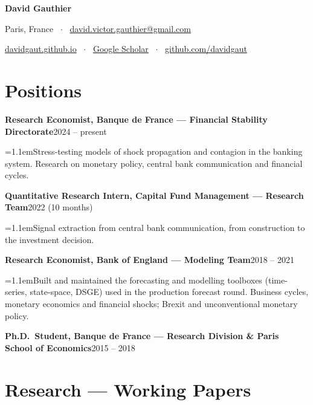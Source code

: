 \documentclass[10pt,a4paper]{article}
\newcommand{\job}[3]{%
  \textbf{#1}\hfill #2\par\nobreak
  {\leftskip=1.1em\small #3\par}%
  \vspace{2.5pt}%
}
\newcommand{\jobplain}[2]{%
  \textbf{#1}\hfill #2\par
  \vspace{2.5pt}%
}
\begin{document}
{\centering
  {\LARGE\bfseries David Gauthier}\par\vspace{3pt}
  {\small Paris, France \ $\cdot$ \
   \href{mailto:david.victor.gauthier@gmail.com}{david.victor.gauthier@gmail.com}\par
   \href{https://davidgaut.github.io}{davidgaut.github.io} \ $\cdot$ \
   \href{https://scholar.google.com/citations?user=FQstpaoAAAAJ}{Google Scholar} \ $\cdot$ \
   \href{https://github.com/davidgaut}{github.com/davidgaut}\par}
  \vspace{4pt}
}

\section{Positions}

\job{Research Economist, Banque de France --- Financial Stability Directorate}{2024 -- present}
{Stress-testing models of shock propagation and contagion in the banking system. Research on
monetary policy, central bank communication and financial cycles.}

\job{Quantitative Research Intern, Capital Fund Management --- Research Team}{2022 (10 months)}
{Signal extraction from central bank communication, from construction to the investment decision.}

\job{Research Economist, Bank of England --- Modeling Team}{2018 -- 2021}
{Built and maintained the forecasting and modelling toolboxes (time-series, state-space, DSGE) used
in the production forecast round. Business cycles, monetary economics and financial shocks; Brexit
and unconventional monetary policy.}

\jobplain{Ph.D.\ Student, Banque de France --- Research Division \& Paris School of Economics}{2015 -- 2018}

\section{Research --- Working Papers}
\end{document}
